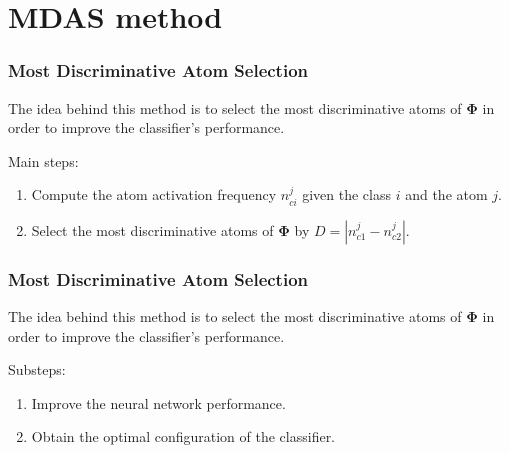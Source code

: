 \documentclass{beamer}
\renewcommand{\vec}[1]{\boldsymbol{\mathbf{#1}}}
\begin{document}
\section{MDAS method}
\begin{frame}
\frametitle {Most Discriminative Atom Selection}
\begin{block}{}
	\begin{center}
		The idea behind this method is to select the most discriminative atoms of $\vec{\Phi}$ in order to improve the classifier's performance.\\
	\end{center}
\end{block}
Main steps:\\
\begin{enumerate}
\item Compute the atom activation frequency $n_{ci}^j$ given the class $i$ and the atom $j$.\\
\item Select the most discriminative atoms of $\vec{\Phi}$ by $D=|n_{c1}^j-n_{c2}^j|$.\\
\end{enumerate}
\vspace{-3mm}
\begin{figure}
\end{figure}
\end{frame}
\begin{frame}
\frametitle {Most Discriminative Atom Selection}
\begin{block}{}
	\begin{center}
		The idea behind this method is to select the most discriminative atoms of $\vec{\Phi}$ in order to improve the classifier's performance.\\
	\end{center}
\end{block}
Substeps:
\begin{enumerate}
\item Improve the neural network performance.\\
\item Obtain the optimal configuration of the classifier.\\
\end{enumerate}
\begin{figure}
\end{figure}
\end{frame}
\end{document}
